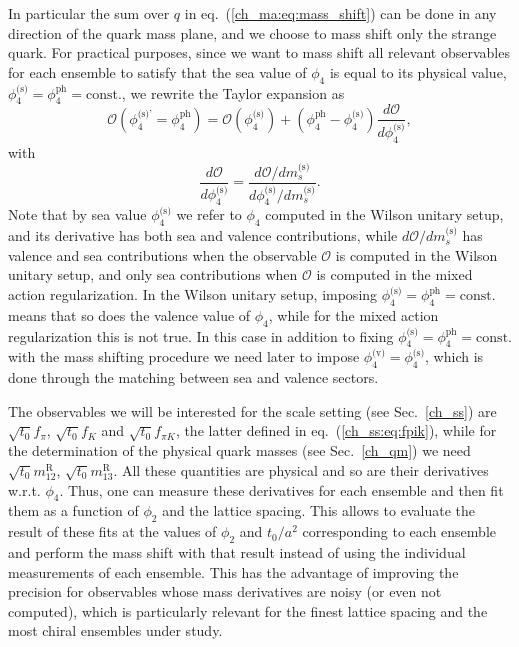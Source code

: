 In particular the sum over $q$ in eq.~(\ref{ch_ma:eq:mass_shift}) can be done in any direction of the quark mass plane, and we choose to mass shift only the strange quark. For practical purposes, since we want to mass shift all relevant observables for each ensemble to satisfy that the sea value of $\phi_4$ is equal to its physical value, $\phi_4^{\textrm{(s)}}=\phi_4^{\textrm{ph}}={\textrm{const.}}$, we rewrite the Taylor expansion as
\begin{equation}
\mathcal{O}\left(\phi_4^{\textrm{(s)'}}=\phi_4^{\textrm{ph}}\right)=\mathcal{O}\left(\phi_4^{\textrm{(s)}}\right)+\left(\phi_4^{\textrm{ph}}-\phi_4^{\textrm{(s)}}\right)\frac{d\mathcal{O}}{d\phi_4^{\textrm{(s)}}},
\end{equation}
with
\begin{equation}
\frac{d\mathcal{O}}{d\phi_4^{\textrm{(s)}}}=\frac{d\mathcal{O}/dm_s^{\textrm{(s)}}}{d\phi_4^{\textrm{(s)}}/dm_s^{\textrm{(s)}}}.
\end{equation}
Note that by sea value $\phi_4^{\textrm{(s)}}$ we refer to $\phi_4$ computed in the Wilson unitary setup, and its derivative has both sea and valence contributions, while $d\mathcal{O}/dm_s^{\textrm{(s)}}$ has valence and sea contributions when the observable $\mathcal{O}$ is computed in the Wilson unitary setup, and only sea contributions when $\mathcal{O}$ is computed in the mixed action regularization. In the Wilson unitary setup, imposing $\phi_4^{\textrm{(s)}}=\phi_4^{\textrm{ph}}={\textrm{const.}}$ means that so does the valence value of $\phi_4$, while for the mixed action regularization this is not true. In this case in addition to fixing $\phi_4^{\textrm{(s)}}=\phi_4^{\textrm{ph}}={\textrm{const.}}$ with the mass shifting procedure we need later to impose $\phi_4^{\textrm{(v)}}=\phi_4^{\textrm{(s)}}$, which is done through the matching between sea and valence sectors.

The observables we will be interested for the scale setting (see Sec.~\ref{ch_ss}) are $\sqrt{t_0}f_{\pi}$, $\sqrt{t_0}f_{K}$ and $\sqrt{t_0}f_{\pi K}$, the latter defined in eq.~(\ref{ch_ss:eq:fpik}), while for the determination of the physical quark masses (see Sec.~\ref{ch_qm}) we need $\sqrt{t_0}m_{12}^{\textrm{R}}$, $\sqrt{t_0}m_{13}^{\textrm{R}}$. All these quantities are physical and so are their derivatives w.r.t. $\phi_4$. Thus, one can measure these derivatives for each ensemble and then fit them as a function of $\phi_2$ and the lattice spacing. This allows to evaluate the result of these fits at the values of $\phi_2$ and $t_0/a^2$ corresponding to each ensemble and perform the mass shift with that result instead of using the individual measurements of each ensemble. This has the advantage of improving the precision for observables whose mass derivatives are noisy (or even not computed), which is particularly relevant for the finest lattice spacing and the most chiral ensembles under study.

